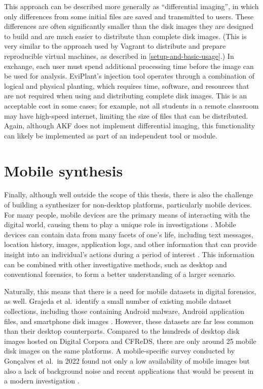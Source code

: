 \documentclass[letterpaper,12pt]{report}
\begin{document}
This approach can be described more generally as ``differential
imaging'', in which only differences from some initial files are saved
and transmitted to users. These differences are often significantly
smaller than the disk images they are designed to build and are much
easier to distribute than complete disk images. (This is very similar to
the approach used by Vagrant to distribute and prepare reproducible
virtual machines, as described in \autoref{setup-and-basic-usage}.) In exchange, each user must spend additional
processing time before the image can be used for analysis. EviPlant's
injection tool operates through a combination of logical and physical
planting, which requires time, software, and resources that are not
required when using and distributing complete disk images. This is an
acceptable cost in some cases; for example, not all students in a remote
classroom may have high-speed internet, limiting the size of files that
can be distributed. Again, although AKF does not implement differential
imaging, this functionality can likely be implemented as part of an
independent tool or module.

\section{Mobile synthesis}\label{mobile-synthesis}

Finally, although well outside the scope of this thesis, there is also
the challenge of building a synthesizer for non-desktop platforms,
particularly mobile devices. For many people, mobile devices are the
primary means of interacting with the digital world, causing them to
play a unique role in investigations
\cite{chernyshevMobileForensicsAdvances2017}. Mobile devices can
contain data from many facets of one's life, including text messages,
location history, images, application logs, and other information that
can provide insight into an individual's actions during a period of
interest \cite{sutiknoCapabilitiesCellebriteUniversal2024}. This
information can be combined with other investigative methods, such as
desktop and conventional forensics, to form a better understanding of a
larger scenario.

Naturally, this means that there is a need for mobile datasets in
digital forensics, as well. Grajeda et al.~identify a small number of
existing mobile dataset collections, including those containing Android
malware, Android application files, and smartphone disk images
\cite{grajedaAvailabilityDatasetsDigital2017}. However, these
datasets are far less common than their desktop counterparts. Compared
to the hundreds of desktop disk images hosted on Digital Corpora and
CFReDS, there are only around 25 mobile disk images on the same
platforms. A mobile-specific survey conducted by Gonçalves et al.~in
2022 found not only a low availability of mobile images but also a lack
of background noise and recent applications that would be present in a
modern investigation \cite{goncalvesRevisitingDatasetGap2022}.
\end{document}
